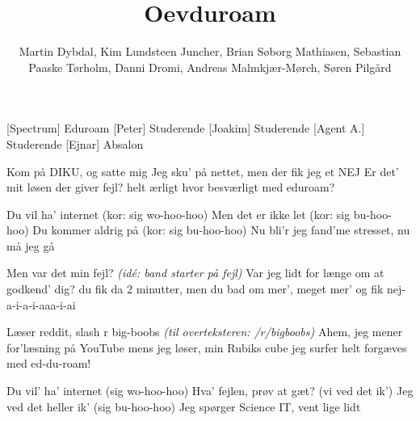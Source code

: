 \documentclass[a4paper,11pt]{article}
\title{Oevduroam}
\author{Martin Dybdal, Kim Lundsteen Juncher, Brian
  Søborg Mathiasen, Sebastian Paaske Tørholm, Danni Dromi, Andreas
  Malmkjær-Mørch, Søren Pilgård}
\begin{document}
 \maketitle

 \begin{roles}
   [Spectrum] Eduroam
   [Peter] Studerende
   [Joakim] Studerende
   [Agent A.] Studerende
   [Ejnar] Absalon
 \end{roles}

 \begin{props}
 \end{props}

\begin{song}

%
  Kom på DIKU, og satte mig
  Jeg sku' på nettet, men der fik jeg et NEJ
  Er det' mit løsen der giver fejl?
  helt ærligt hvor besværligt med eduroam?


%
  Du vil ha' internet (kor: sig wo-hoo-hoo)
  Men det er ikke let (kor: sig bu-hoo-hoo)
  Du kommer aldrig på (kor: sig bu-hoo-hoo)
  Nu bli'r jeg fand'me stresset, nu må jeg gå


%
  Men var det min fejl? \textit{(idé: band starter på fejl)}
  Var jeg lidt for længe om at godkend' dig?
  du fik da 2 minutter, men du bad om mer', meget mer'
  og fik nej-a-i-a-i-aaa-i-ai

%
  Læser reddit, slash r big-boobs \textit{(til overteksteren: /r/bigboobs)}
  Ahem, jeg mener for'læsning på YouTube 
  mens jeg løser, min Rubiks cube
  jeg surfer helt forgæves med ed-du-roam!


%
  Du vil' ha' internet (sig wo-hoo-hoo)
  Hva' fejlen, prøv at gæt? (vi ved det ik')
  Jeg ved det heller ik' (sig bu-hoo-hoo)
  Jeg spørger Science IT, vent lige lidt



\end{song}
\end{document}
